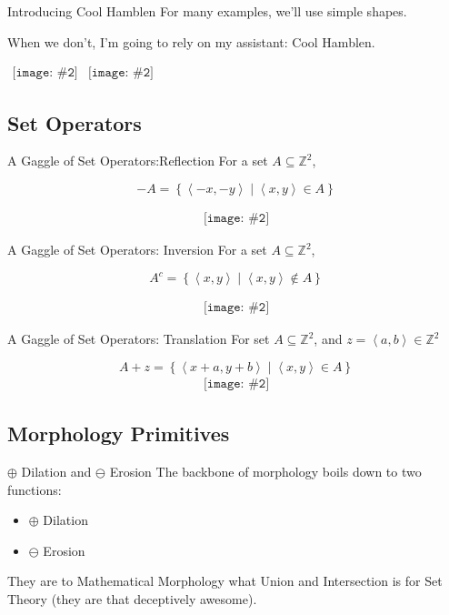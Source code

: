 \documentclass{beamer}
\newcommand{\pic}[2]{
     \begin{array}{l}
      \texttt{[image: \#2]}
      \end{array}
}
\newcommand{\set}[1]{\left\lbrace #1 \right\rbrace}
\newcommand{\buildset}[2]{\set{#1 \mid #2}}
\newcommand{\tuple}[1]{\left\langle #1 \right\rangle}
\newcommand{\integers}{\mathbb{Z}}
\newcommand{\dilate}{\oplus}
\newcommand{\erode}{\ominus}
\begin{document}
\begin{frame}{Introducing Cool Hamblen}
For many examples, we'll use simple shapes.

When we don't, I'm going to rely on my assistant: Cool Hamblen.

$\pic{width=100pt}{./images/coolhamblen.png}
\pic{width=100pt}{./images/binarycoolhamblen.png}$
\end{frame}

\subsection{Set Operators}
\begin{frame}{A Gaggle of Set Operators:Reflection}
  For a set $A \subseteq \integers^2$,

           $$-A = \buildset{\tuple{-x,-y}}
                          {\tuple{x,y} \in A}$$

           $$\pic{width=50pt}{./images/coolhamblen_reflected.png}$$
\end{frame}
%
\begin{frame}{A Gaggle of Set Operators: Inversion}
   For a set $A \subseteq \integers^2$,
          
          $$A^c = \buildset{\tuple{x,y}}
                          {\tuple{x,y}\not\in A}$$

          $$\pic{width=50pt}{./images/coolhamblen_complement.png}$$
\end{frame}
\begin{frame}{A Gaggle of Set Operators: Translation}
  For set $A \subseteq \mathbb{Z}^2$, and $z=\tuple{a,b} \in \mathbb{Z}^2$


    $$A+z = \buildset{\tuple{x+a,y+b}}
                    {\tuple{x,y} \in A}$$
    $$\pic{width=50pt}{./images/coolhamblen_translated.png}$$
\end{frame} 

\subsection{Morphology Primitives}
\begin{frame}{$\dilate$ Dilation and $\erode$ Erosion}
  The backbone of morphology boils down to two functions:
  \begin{itemize}
    \item $\dilate$ Dilation
    \item $\erode$ Erosion
  \end{itemize}
  They are to Mathematical Morphology what Union and Intersection is for
  Set Theory (they are that deceptively awesome).
\end{frame}
\end{document}
